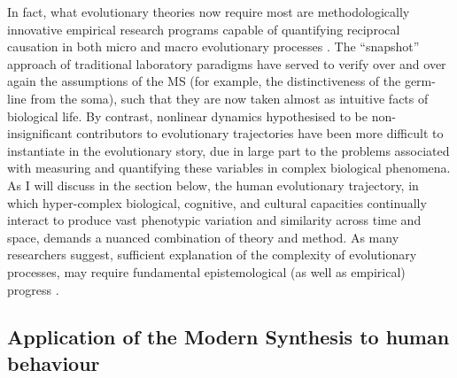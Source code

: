 In fact, what evolutionary theories now require most are methodologically innovative empirical research programs capable of quantifying reciprocal causation in both micro and macro evolutionary processes \citep{Wray2014,Laland2015,Svensson2017}.  The ``snapshot'' approach of traditional laboratory paradigms have served to verify over and over again the assumptions of the MS (for example, the distinctiveness of the germ-line from the soma), such that they are now taken almost as intuitive facts of biological life.  By contrast, nonlinear dynamics hypothesised to be non-insignificant contributors to evolutionary trajectories have been more difficult to instantiate in the evolutionary story, due in large part to the problems associated with measuring and quantifying these variables in complex biological phenomena.  As I will discuss in the section below, the human evolutionary trajectory, in which hyper-complex biological, cognitive, and cultural capacities continually interact to produce vast phenotypic variation and similarity across time and space, demands a nuanced combination of theory and method. As many researchers suggest, sufficient explanation of the complexity of evolutionary processes,  may require fundamental epistemological (as well as empirical) progress \citep{Levins1985,Varela1991,Kelso2006,Fuentes2016a}.




\subsection{Application of the Modern Synthesis to human behaviour}

